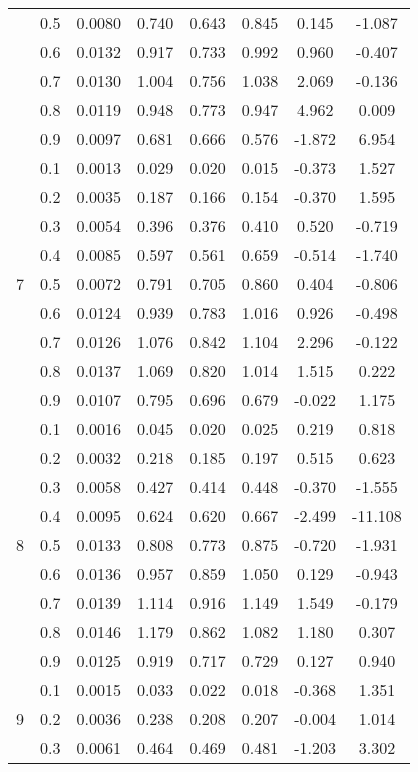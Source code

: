 \documentclass[11pt,a4paper]{report}
\begin{document}
\begin{longtable}{ | c | c || c | c | c | c | c | c | }
 & 0.5 & 0.0080 & 0.740 & 0.643 & 0.845 & 0.145 & -1.087 \\
 & 0.6 & 0.0132 & 0.917 & 0.733 & 0.992 & 0.960 & -0.407 \\
 & 0.7 & 0.0130 & 1.004 & 0.756 & 1.038 & 2.069 & -0.136 \\
 & 0.8 & 0.0119 & 0.948 & 0.773 & 0.947 & 4.962 & 0.009 \\
 & 0.9 & 0.0097 & 0.681 & 0.666 & 0.576 & -1.872 & 6.954 \\
 \hline
\multirow{9}{*}{7} & 0.1 & 0.0013 & 0.029 & 0.020 & 0.015 & -0.373 & 1.527 \\
 & 0.2 & 0.0035 & 0.187 & 0.166 & 0.154 & -0.370 & 1.595 \\
 & 0.3 & 0.0054 & 0.396 & 0.376 & 0.410 & 0.520 & -0.719 \\
 & 0.4 & 0.0085 & 0.597 & 0.561 & 0.659 & -0.514 & -1.740 \\
 & 0.5 & 0.0072 & 0.791 & 0.705 & 0.860 & 0.404 & -0.806 \\
 & 0.6 & 0.0124 & 0.939 & 0.783 & 1.016 & 0.926 & -0.498 \\
 & 0.7 & 0.0126 & 1.076 & 0.842 & 1.104 & 2.296 & -0.122 \\
 & 0.8 & 0.0137 & 1.069 & 0.820 & 1.014 & 1.515 & 0.222 \\
 & 0.9 & 0.0107 & 0.795 & 0.696 & 0.679 & -0.022 & 1.175 \\
 \hline
\multirow{9}{*}{8} & 0.1 & 0.0016 & 0.045 & 0.020 & 0.025 & 0.219 & 0.818 \\
 & 0.2 & 0.0032 & 0.218 & 0.185 & 0.197 & 0.515 & 0.623 \\
 & 0.3 & 0.0058 & 0.427 & 0.414 & 0.448 & -0.370 & -1.555 \\
 & 0.4 & 0.0095 & 0.624 & 0.620 & 0.667 & -2.499 & -11.108 \\
 & 0.5 & 0.0133 & 0.808 & 0.773 & 0.875 & -0.720 & -1.931 \\
 & 0.6 & 0.0136 & 0.957 & 0.859 & 1.050 & 0.129 & -0.943 \\
 & 0.7 & 0.0139 & 1.114 & 0.916 & 1.149 & 1.549 & -0.179 \\
 & 0.8 & 0.0146 & 1.179 & 0.862 & 1.082 & 1.180 & 0.307 \\
 & 0.9 & 0.0125 & 0.919 & 0.717 & 0.729 & 0.127 & 0.940 \\
 \hline
\multirow{9}{*}{9} & 0.1 & 0.0015 & 0.033 & 0.022 & 0.018 & -0.368 & 1.351 \\
 & 0.2 & 0.0036 & 0.238 & 0.208 & 0.207 & -0.004 & 1.014 \\
 & 0.3 & 0.0061 & 0.464 & 0.469 & 0.481 & -1.203 & 3.302 \\

\end{longtable}
\end{document}
